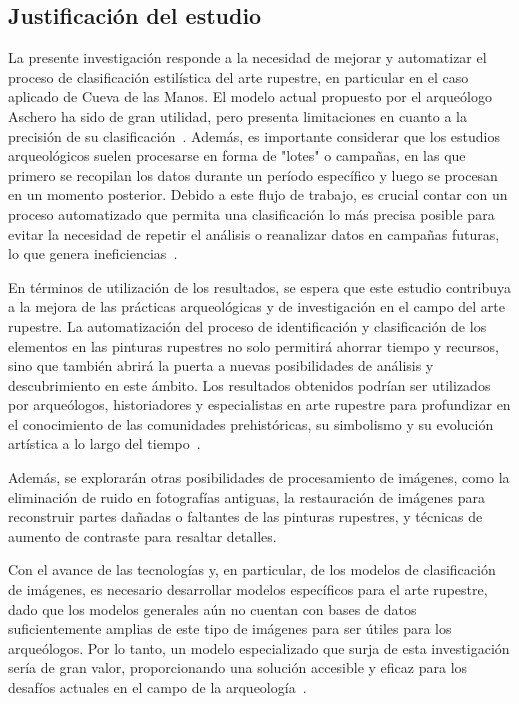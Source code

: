 \subsection{Justificación del estudio}

La presente investigación responde a la necesidad de mejorar y automatizar el proceso de clasificación estilística del arte rupestre, en particular en el caso aplicado de Cueva de las Manos. El modelo actual propuesto por el arqueólogo Aschero ha sido de gran utilidad, pero presenta limitaciones en cuanto a la precisión de su clasificación~\cite{aschero2000}. Además, es importante considerar que los estudios arqueológicos suelen procesarse en forma de "lotes" o campañas, en las que primero se recopilan los datos durante un período específico y luego se procesan en un momento posterior. Debido a este flujo de trabajo, es crucial contar con un proceso automatizado que permita una clasificación lo más precisa posible para evitar la necesidad de repetir el análisis o reanalizar datos en campañas futuras, lo que genera ineficiencias~\cite{aschero1998}.

En términos de utilización de los resultados, se espera que este estudio contribuya a la mejora de las prácticas arqueológicas y de investigación en el campo del arte rupestre. La automatización del proceso de identificación y clasificación de los elementos en las pinturas rupestres no solo permitirá ahorrar tiempo y recursos, sino que también abrirá la puerta a nuevas posibilidades de análisis y descubrimiento en este ámbito. Los resultados obtenidos podrían ser utilizados por arqueólogos, historiadores y especialistas en arte rupestre para profundizar en el conocimiento de las comunidades prehistóricas, su simbolismo y su evolución artística a lo largo del tiempo~\cite{aschero2018}.

Además, se explorarán otras posibilidades de procesamiento de imágenes, como la eliminación de ruido en fotografías antiguas, la restauración de imágenes para reconstruir partes dañadas o faltantes de las pinturas rupestres, y técnicas de aumento de contraste para resaltar detalles.

Con el avance de las tecnologías y, en particular, de los modelos de clasificación de imágenes, es necesario desarrollar modelos específicos para el arte rupestre, dado que los modelos generales aún no cuentan con bases de datos suficientemente amplias de este tipo de imágenes para ser útiles para los arqueólogos. Por lo tanto, un modelo especializado que surja de esta investigación sería de gran valor, proporcionando una solución accesible y eficaz para los desafíos actuales en el campo de la arqueología~\cite{aschero2018}.


